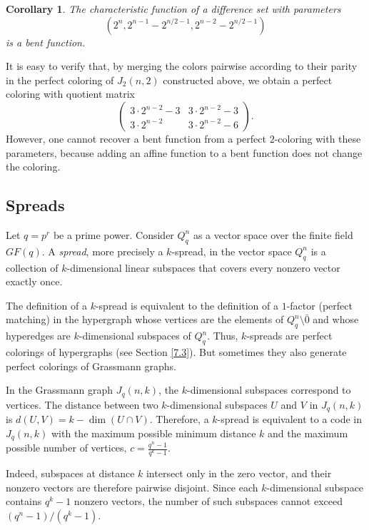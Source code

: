 \documentclass[11pt]{article}
\newtheorem{corollary}{Corollary}[section]
\theoremstyle{definition}
\begin{document}
{{{\begin{corollary}
The characteristic function of a difference set with parameters
\[
\left(2^n,
2^{n-1}-2^{n/2-1},
2^{n-2}-2^{n/2-1}\right)
\]
is a bent function.
\end{corollary}

It is easy to verify that, by merging the colors pairwise according to their parity in the perfect coloring of $J_2(n,2)$ constructed above, we obtain a perfect coloring with quotient matrix
\[
\begin{pmatrix}
3\cdot2^{n-2}-3&3\cdot2^{n-2}-3\\
3\cdot2^{n-2}&3\cdot2^{n-2}-6
\end{pmatrix}.
\]
However, one cannot recover a bent function from a perfect $2$-coloring with these parameters, because adding an affine function to a bent function does not change the coloring.


\subsection{Spreads}



Let $q=p^r$ be a prime power. Consider $Q_q^n$ as a vector space over the finite field $GF(q)$.
A {\sl spread}, more precisely a $k$-spread, in the vector space $Q_q^n$ is a collection of $k$-dimensional linear subspaces that covers every nonzero vector exactly once.

The definition of a $k$-spread is equivalent to the definition of a $1$-factor (perfect matching) in the hypergraph whose vertices are the elements of $Q_q^n\setminus{\bar 0}$ and whose hyperedges are $k$-dimensional subspaces of $Q_q^n$. Thus, $k$-spreads are perfect colorings of hypergraphs (see Section \ref{7.3}). But sometimes they also generate perfect colorings of Grassmann graphs. 

In the Grassmann graph $J_q(n,k)$, the $k$-dimensional subspaces correspond to vertices. The distance between two $k$-dimensional subspaces $U$ and $V$ in $J_q(n,k)$ is
$
d(U,V)=k-\dim(U\cap V)$.
Therefore, a $k$-spread is equivalent to a code in $J_q(n,k)$ with the maximum possible minimum distance $k$ and the maximum possible number of vertices,
$c=\frac{q^n-1}{q^k-1}$.

Indeed, subspaces at distance $k$ intersect only in the zero vector, and their nonzero vectors are therefore pairwise disjoint. Since each $k$-dimensional subspace contains $q^k-1$ nonzero vectors, the number of such subspaces cannot exceed $(q^n-1)/(q^k-1)$.

}}}
\end{document}

